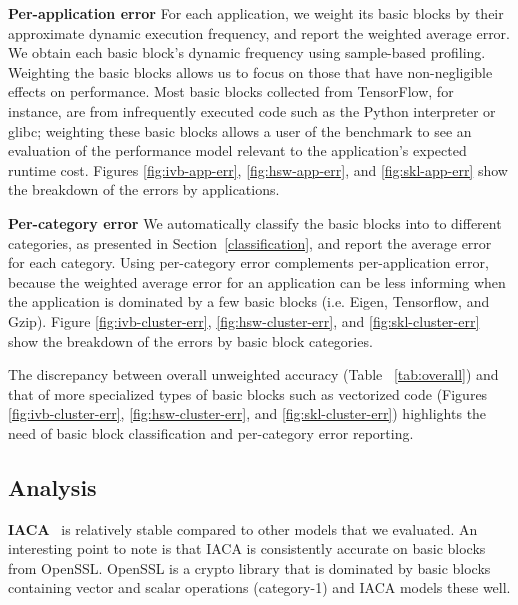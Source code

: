 \textbf{Per-application error}
For each application, we weight its basic blocks by their approximate
dynamic execution frequency,
and report the weighted average error.
We obtain each basic block's dynamic frequency using sample-based profiling.
Weighting the basic blocks allows us to focus on those that have
non-negligible effects on performance.
Most basic blocks collected from TensorFlow\cite{tensorflow},
for instance, are from infrequently executed code 
such as the Python interpreter or glibc;
weighting these basic blocks allows a user of the benchmark
to see an evaluation  of the performance model relevant
to the application's expected runtime cost.
Figures \ref{fig:ivb-app-err}, \ref{fig:hsw-app-err}, and \ref{fig:skl-app-err}
show the breakdown of the errors by applications.

\textbf{Per-category error} 
We automatically classify the basic blocks into
to different categories, as presented in Section~\ref{classification},
and report the average error for each category.
Using per-category error complements per-application error,
because the weighted average error for an application can be less informing 
when the application is dominated by a few basic blocks
(i.e. Eigen, Tensorflow, and Gzip).
Figure \ref{fig:ivb-cluster-err}, \ref{fig:hsw-cluster-err}, 
and \ref{fig:skl-cluster-err} show the breakdown of the errors by basic block categories.

The discrepancy between overall unweighted accuracy (Table ~\ref{tab:overall})
and that of more specialized types of basic blocks
such as vectorized code (Figures \ref{fig:ivb-cluster-err},
\ref{fig:hsw-cluster-err},
and \ref{fig:skl-cluster-err}) highlights
the need of basic block classification and per-category error reporting.

\subsection{Analysis}
 
 
 \textbf{IACA}~\cite{iaca} is relatively stable compared to other models that we evaluated.
An interesting point to note is that IACA is consistently accurate on basic blocks from OpenSSL. 
OpenSSL is a crypto library that is dominated by basic blocks containing vector and scalar operations
(category-1) and IACA models these well. 

